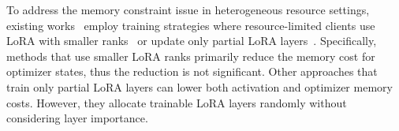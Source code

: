 \documentclass[lettersize,journal]{IEEEtran}
\begin{document}
To address the memory constraint issue in heterogeneous resource settings,
existing works~\cite{su2023fedra,cho2023heterogeneous,wang2024flora,bai2024flexlora} employ training strategies where resource-limited clients use LoRA with smaller ranks~\cite{cho2023heterogeneous,wang2024flora,bai2024flexlora} or update
only partial
LoRA layers~\cite{su2023fedra}. 
Specifically, methods that use smaller LoRA ranks primarily reduce the memory cost for optimizer states, thus the reduction is not significant.
Other approaches that train only partial LoRA layers can lower both activation and optimizer memory costs. However, they allocate trainable LoRA layers randomly without considering layer importance.
%
%
%
\end{document}
